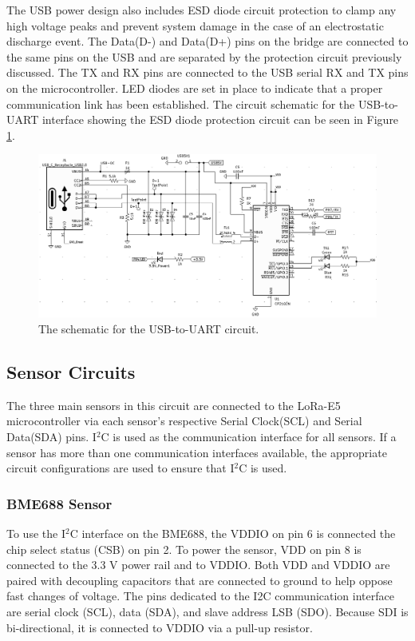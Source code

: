 \documentclass[conference]{IEEEtran}
\newcommand*{\iic}{I$^2$C\xspace}
\begin{document}
The USB power design also includes ESD diode circuit protection to clamp any high voltage peaks and prevent system damage in the case of an electrostatic discharge event. The Data(D-) and Data(D+) pins on the bridge are connected to the same pins on the USB and are separated by the protection circuit previously discussed. The TX and RX pins are connected to the USB serial RX and TX pins on the microcontroller. LED diodes are set in place to indicate that a proper communication link has been established. The circuit schematic for the USB-to-UART interface showing the ESD diode protection circuit can be seen in Figure \ref{fig:USB_UART}. 

\begin{figure}
    \centering
    \includegraphics[scale=0.75,angle=270,origin=c]{img/USB_UART.PNG}
    \caption{The schematic for the USB-to-UART circuit.}
    \label{fig:USB_UART}
\end{figure}

\subsection{Sensor Circuits}
The three main sensors in this circuit are connected to the LoRa-E5 microcontroller via each sensor's respective Serial Clock(SCL) and Serial Data(SDA) pins. \iic is used as the communication interface for all sensors. If a sensor has more than one communication interfaces available, the appropriate circuit configurations are used to ensure that \iic is used.

\subsubsection{BME688 Sensor}
 To use the \iic interface on the BME688, the VDDIO on pin 6 is connected the chip select status (CSB) on pin 2. To power the sensor, VDD on pin 8 is connected to the 3.3 V power rail and to VDDIO. Both VDD and VDDIO are paired with decoupling capacitors that are connected to ground to help oppose fast changes of voltage. The pins dedicated to the I2C communication interface are serial clock (SCL), data (SDA), and slave address LSB (SDO). Because SDI is bi-directional, it is connected to VDDIO via a pull-up resistor. 
 
\end{document}
